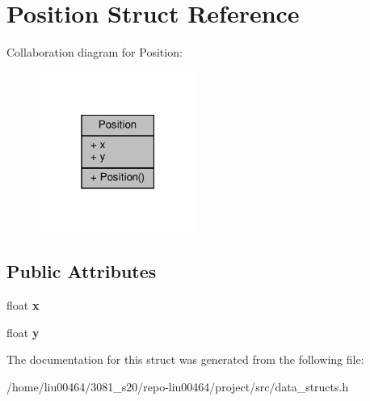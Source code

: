 \hypertarget{structPosition}{}\section{Position Struct Reference}
\label{structPosition}


Collaboration diagram for Position\+:\nopagebreak
\begin{figure}[H]
\begin{center}
\leavevmode
\includegraphics[width=147pt]{structPosition__coll__graph}
\end{center}
\end{figure}
\subsection*{Public Attributes}
\begin{DoxyCompactItemize}
\item 
\mbox{\label{structPosition_af684446cbf0f6d53386686283da6dcc6}} 
float {\bfseries x}
\item 
\mbox{\label{structPosition_a54a6182b5f7539295b32255808897d3f}} 
float {\bfseries y}
\end{DoxyCompactItemize}


The documentation for this struct was generated from the following file\+:\begin{DoxyCompactItemize}
\item 
/home/liu00464/3081\+\_\+s20/repo-\/liu00464/project/src/data\+\_\+structs.\+h\end{DoxyCompactItemize}
